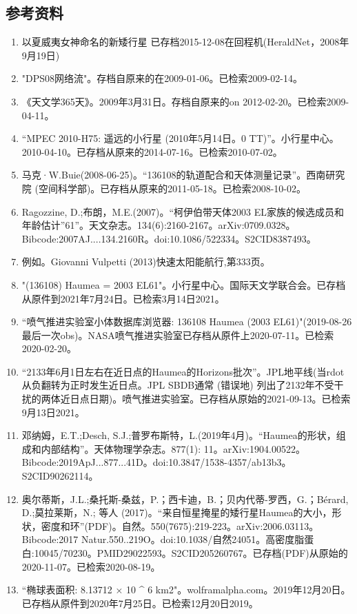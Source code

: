 \subsection{参考资料}
\begin{enumerate}
\item 以夏威夷女神命名的新矮行星 已存档2015-12-08在回程机(HeraldNet，2008年9月19日)
\item "DPS08网络流"。存档自原来的在2009-01-06。已检索2009-02-14。
\item 《天文学365天》。2009年3月31日。存档自原来的on 2012-02-20。已检索2009-04-11。
\item “MPEC 2010-H75: 遥远的小行星 (2010年5月14日。0 TT)”。小行星中心。2010-04-10。已存档从原来的2014-07-16。已检索2010-07-02。
\item 马克·W.Buie(2008-06-25)。“136108的轨道配合和天体测量记录”。西南研究院 (空间科学部)。已存档从原来的2011-05-18。已检索2008-10-02。
\item Ragozzine, D.;布朗，M.E.(2007)。“柯伊伯带天体2003 EL家族的候选成员和年龄估计”61”。天文杂志。134(6):2160-2167。arXiv:0709.0328。Bibcode:2007AJ....134.2160R。doi:10.1086/522334。S2CID8387493。  
\item 例如。Giovanni Vulpetti (2013)快速太阳能航行,第333页。
\item "(136108) Haumea = 2003 EL61"。小行星中心。国际天文学联合会。已存档从原件到2021年7月24日。已检索3月14日2021。
\item “喷气推进实验室小体数据库浏览器: 136108 Haumea (2003 EL61)"(2019-08-26最后一次obs)。NASA喷气推进实验室已存档从原件上2020-07-11。已检索2020-02-20。
\item “2133年6月1日左右在近日点的Haumea的Horizons批次”。JPL地平线(当rdot从负翻转为正时发生近日点。JPL SBDB通常 (错误地) 列出了2132年不受干扰的两体近日点日期)。喷气推进实验室。已存档从原始的2021-09-13。已检索9月13日2021。
\item 邓纳姆，E.T.;Desch, S.J.;普罗布斯特，L.(2019年4月)。“Haumea的形状，组成和内部结构”。天体物理学杂志。877(1): 11。arXiv:1904.00522。Bibcode:2019ApJ...877...41D。doi:10.3847/1538-4357/ab13b3。S2CID90262114。  
\item 奥尔蒂斯，J.L.;桑托斯-桑兹，P.；西卡迪，B.；贝内代蒂-罗西，G.；Bérard, D.;莫拉莱斯，N.; 等人 (2017)。“来自恒星掩星的矮行星Haumea的大小，形状，密度和环”(PDF)。自然。550(7675):219-223。arXiv:2006.03113。Bibcode:2017 Natur.550..219O。doi:10.1038/自然24051。高密度脂蛋白:10045/70230。PMID29022593。S2CID205260767。已存档(PDF)从原始的2020-11-07。已检索2020-08-19。   
\item “椭球表面积: 8.13712 × 10 ^ 6 km2"。wolframalpha.com。2019年12月20日。已存档从原件到2020年7月25日。已检索12月20日2019。

\end{enumerate}
